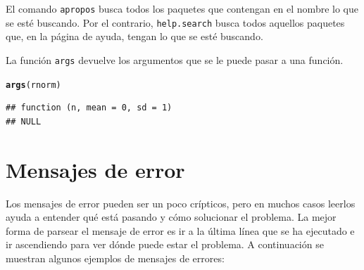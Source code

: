 \documentclass{config/apuntes}\usepackage[]{graphicx}\usepackage[]{xcolor}
\makeatletter
\newcommand{\hldef}[1]{\textcolor[rgb]{0.345,0.345,0.345}{#1}}%
\newcommand{\hlkwd}[1]{\textcolor[rgb]{0.737,0.353,0.396}{\textbf{#1}}}%
\newenvironment{kframe}{%
 \def\at@end@of@kframe{}%
 \ifinner\ifhmode%
  \def\at@end@of@kframe{\end{minipage}}%
  \begin{minipage}{\columnwidth}%
 \fi\fi%
 \def\FrameCommand##1{\hskip\@totalleftmargin \hskip-\fboxsep
 \colorbox{shadecolor}{##1}\hskip-\fboxsep
     \hskip-\linewidth \hskip-\@totalleftmargin \hskip\columnwidth}%
 \MakeFramed {\advance\hsize-\width
   \@totalleftmargin\z@ \linewidth\hsize
   \@setminipage}}%
 {\par\unskip\endMakeFramed%
 \at@end@of@kframe}
\newenvironment{knitrout}{}{} %
\newcommand{\code}[1]{\texttt{#1}}
\makeatother
\begin{document}
El comando \code{apropos} busca todos los paquetes que contengan en el nombre lo que se esté buscando. Por el contrario, \code{help.search} busca todos aquellos paquetes que, en la página de ayuda, tengan lo que se esté buscando. 

La función \code{args} devuelve los argumentos que se le puede pasar a una función.
\begin{knitrout}
\color{fgcolor}\begin{kframe}
\begin{alltt}
\hlkwd{args}\hldef{(rnorm)}
\end{alltt}
\begin{verbatim}
## function (n, mean = 0, sd = 1) 
## NULL
\end{verbatim}
\end{kframe}
\end{knitrout}

\section{Mensajes de error}
Los mensajes de error pueden ser un poco crípticos, pero en muchos casos leerlos ayuda a entender qué está pasando y cómo solucionar el problema. La mejor forma de parsear el mensaje de error es ir a la última línea que se ha ejecutado e ir ascendiendo para ver dónde puede estar el problema. A continuación se muestran algunos ejemplos de mensajes de errores:
\end{document}
